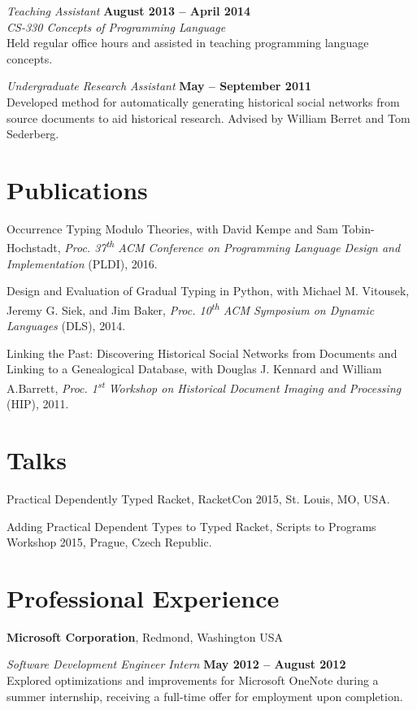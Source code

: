 \documentclass[margin,line]{res}
\newcommand{\ts}{\textsuperscript}
\begin{document}
\begin{resume}
{\em Teaching Assistant} \hfill {\bf August 2013 -- April 2014}\\
{\em CS-330  Concepts of Programming Language}\\
Held regular office hours and assisted in teaching programming
language concepts.


{\em Undergraduate Research Assistant} \hfill {\bf May --
  September 2011}\\
Developed method for automatically generating historical social
networks from source documents to aid historical research. Advised by
William Berret and Tom Sederberg.


\section{\sc Publications}

Occurrence Typing Modulo Theories, with David Kempe and Sam
Tobin-Hochstadt, {\em Proc. 37\ts{th} ACM Conference on Programming 
Language Design and Implementation} (PLDI), 2016.

Design and Evaluation of Gradual Typing in Python, with Michael
M. Vitousek, Jeremy G. Siek, and Jim Baker, {\em Proc.  10\ts{th} ACM
  Symposium on Dynamic Languages} (DLS), 2014.

Linking the Past: Discovering Historical Social Networks from
Documents and Linking to a Genealogical Database, with Douglas
J. Kennard and William A.Barrett, {\em Proc. 1\ts{st} Workshop on
  Historical Document Imaging and Processing} (HIP), 2011.

\section{\sc Talks}
Practical Dependently Typed Racket, RacketCon 2015, St. Louis, MO, USA.

Adding Practical Dependent Types to Typed Racket, Scripts to Programs Workshop 2015, Prague, Czech Republic.

\section{\sc Professional Experience}
{\bf Microsoft Corporation}, Redmond, Washington USA

\vspace{-.3cm}
{\em Software Development Engineer Intern} \hfill {\bf May 2012 -- August 2012}\\
Explored optimizations and improvements for Microsoft OneNote during a
summer internship, receiving a full-time offer for employment upon completion.


\end{resume}
\end{document}
